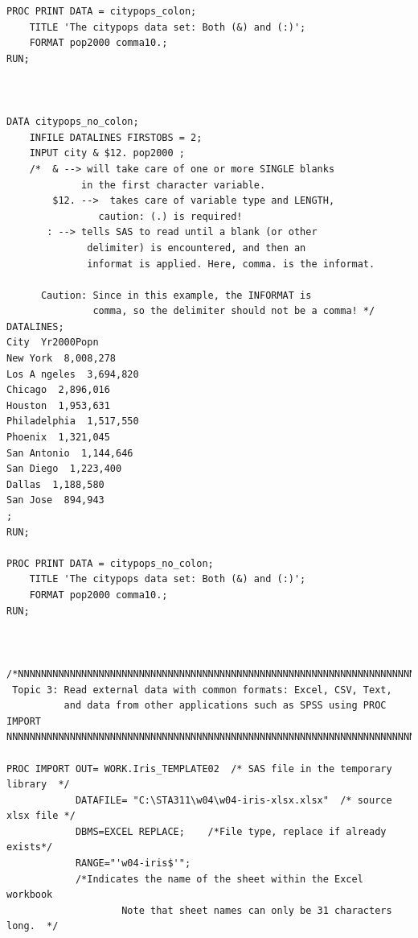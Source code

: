 \documentclass[
]{book}
\begin{document}
\begin{verbatim}
PROC PRINT DATA = citypops_colon;
    TITLE 'The citypops data set: Both (&) and (:)';
    FORMAT pop2000 comma10.;
RUN;



DATA citypops_no_colon;
    INFILE DATALINES FIRSTOBS = 2;
    INPUT city & $12. pop2000 ;
    /*  & --> will take care of one or more SINGLE blanks
             in the first character variable.
        $12. -->  takes care of variable type and LENGTH, 
                caution: (.) is required!
       : --> tells SAS to read until a blank (or other 
              delimiter) is encountered, and then an 
              informat is applied. Here, comma. is the informat. 

      Caution: Since in this example, the INFORMAT is 
               comma, so the delimiter should not be a comma! */
DATALINES;
City  Yr2000Popn
New York  8,008,278
Los A ngeles  3,694,820
Chicago  2,896,016
Houston  1,953,631
Philadelphia  1,517,550
Phoenix  1,321,045
San Antonio  1,144,646
San Diego  1,223,400
Dallas  1,188,580
San Jose  894,943
;
RUN;

PROC PRINT DATA = citypops_no_colon;
    TITLE 'The citypops data set: Both (&) and (:)';
    FORMAT pop2000 comma10.;
RUN;



/*NNNNNNNNNNNNNNNNNNNNNNNNNNNNNNNNNNNNNNNNNNNNNNNNNNNNNNNNNNNNNNNNNNNNNNNN
 Topic 3: Read external data with common formats: Excel, CSV, Text,
          and data from other applications such as SPSS using PROC IMPORT
NNNNNNNNNNNNNNNNNNNNNNNNNNNNNNNNNNNNNNNNNNNNNNNNNNNNNNNNNNNNNNNNNNNNNNNNNN*/

PROC IMPORT OUT= WORK.Iris_TEMPLATE02  /* SAS file in the temporary library  */
            DATAFILE= "C:\STA311\w04\w04-iris-xlsx.xlsx"  /* source xlsx file */
            DBMS=EXCEL REPLACE;    /*File type, replace if already exists*/
            RANGE="'w04-iris$'";   
            /*Indicates the name of the sheet within the Excel workbook
                    Note that sheet names can only be 31 characters long.  */ 
                           

\end{verbatim}
\end{document}

